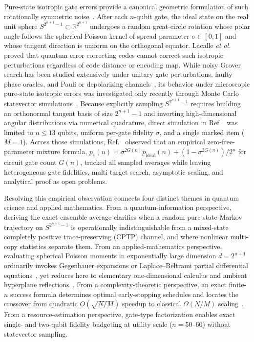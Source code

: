 Pure-state isotropic gate errors provide a canonical geometric formulation of such rotationally symmetric noise~\cite{FonsecaDeOliveira2017,LacallePozoCoronado2019,Lacalle2021,Lacalle2026}. After each $n$-qubit gate, the ideal state on the real unit sphere $S^{2^{n+1}-1} \subset \mathbb{R}^{2^{n+1}}$ undergoes a random great-circle rotation whose polar angle follows the spherical Poisson kernel of spread parameter $\sigma \in [0, 1]$ and whose tangent direction is uniform on the orthogonal equator. Lacalle \emph{et al.}~\cite{Lacalle2021} proved that quantum error-correcting codes cannot correct such isotropic perturbations regardless of code distance or encoding map. While noisy Grover search has been studied extensively under unitary gate perturbations, faulty phase oracles, and Pauli or depolarizing channels~\cite{Shapira2003,Shenvi2003,Salas2008,Cohn2016}, its behavior under microscopic pure-state isotropic errors was investigated only recently through Monte Carlo statevector simulations~\cite{SahaRoyLacalle2026}. Because explicitly sampling $S^{2^{n+1}-1}$ requires building an orthonormal tangent basis of size $2^{n+1} - 1$ and inverting high-dimensional angular distributions via numerical quadrature, direct simulation in Ref.~\cite{SahaRoyLacalle2026} was limited to $n \le 13$ qubits, uniform per-gate fidelity $\sigma$, and a single marked item ($M = 1$). Across those simulations, Ref.~\cite{SahaRoyLacalle2026} observed that an empirical zero-free-parameter mixture formula, $p_e(n) = \sigma^{2G(n)} p_{\mathrm{ideal}}(n) + (1 - \sigma^{2G(n)})/2^n$ for circuit gate count $G(n)$, tracked all sampled averages while leaving heterogeneous gate fidelities, multi-target search, asymptotic scaling, and analytical proof as open problems.

Resolving this empirical observation connects four distinct themes in quantum science and applied mathematics. From a quantum-information perspective, deriving the exact ensemble average clarifies when a random pure-state Markov trajectory on $S^{2^{n+1}-1}$ is operationally indistinguishable from a mixed-state completely positive trace-preserving (CPTP) channel, and where nonlinear multi-copy statistics separate them. From an applied-mathematics perspective, evaluating spherical Poisson moments in exponentially large dimension $d = 2^{n+1}$ ordinarily invokes Gegenbauer expansions or Laplace--Beltrami partial differential equations~\cite{Axler2001}, yet reduces here to elementary one-dimensional calculus and ambient hyperplane reflections~\cite{Muirhead1982,MardiaJupp2000}. From a complexity-theoretic perspective, an exact finite-$n$ success formula determines optimal early-stopping schedules and locates the crossover from quadratic $O(\sqrt{N/M})$ speedup to classical $\Omega(N/M)$ scaling~\cite{Grover1996,Grover1997,Boyer1998,Zalka1999}. From a resource-estimation perspective, gate-type factorization enables exact single- and two-qubit fidelity budgeting at utility scale ($n = 50$--$60$) without statevector sampling.

